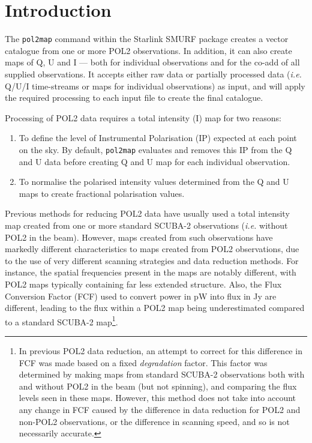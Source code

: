 \documentclass[twoside,11pt]{starlink}
\begin{document}
\scfrontmatter

\section{Introduction}
The \texttt{pol2map} command within the Starlink SMURF package creates a
vector catalogue from one or more POL2 observations.  In addition, it can
also create maps of Q, U and I --- both for individual observations and for
the co-add of all supplied observations. It accepts either raw data or
partially processed data (\emph{i.e.} Q/U/I time-streams or maps for
individual observations) as input, and will apply the required processing
to each input file to create the final catalogue.

Processing of POL2 data requires a total intensity (I) map for two reasons:

\begin{enumerate}
\item To define the level of Instrumental Polarisation (IP) expected at
each point on the sky. By default, \texttt{pol2map} evaluates and removes
this IP from
the Q and U data before creating Q and U map for each individual observation.
\item To normalise the polarised intensity values determined from the Q
and U maps to create fractional polarisation values.
\end{enumerate}

Previous methods for reducing POL2 data have usually used a total
intensity map created from one or more standard SCUBA-2 observations
(\emph{i.e.} without POL2 in the beam). However, maps created from
such observations have markedly different characteristics to maps created
from POL2 observations, due to the use of very different scanning
strategies and data reduction methods. For instance, the spatial
frequencies present in the maps are notably different, with POL2 maps
typically containing far less extended structure. Also, the Flux
Conversion Factor (FCF) used to convert power in pW into flux in Jy are
different, leading to the flux within a POL2 map being underestimated
compared to a standard SCUBA-2 map\footnote{In previous POL2 data
reduction, an attempt to correct for this difference in FCF was made
based on a fixed \emph{degradation} factor. This factor was determined
by making maps from standard SCUBA-2 observations both with and without
POL2 in the beam (but not spinning), and comparing the flux levels seen
in these maps. However, this method does not take into account any change
in FCF caused by the difference in data reduction for POL2 and non-POL2
observations, or the difference in scanning speed, and so is not
necessarily accurate.}.
\end{document}

